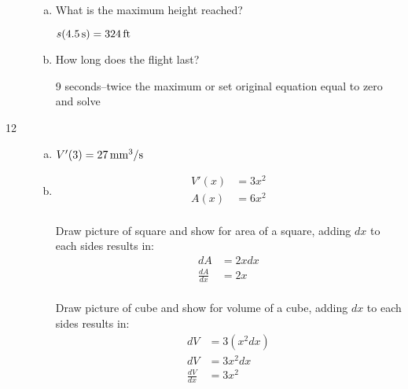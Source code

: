 \documentclass[letterpaper, landscape]{exam}
\begin{document}
\begin{description}
\begin{enumerate}[(a)]
        \item What is the maximum height reached?
          \begin{solution}
            $s(\unit[4.5]{s}) = \unit[324]{ft}$
          \end{solution}

        \item How long does the flight last?
          \begin{solution}
            9 seconds--twice the maximum or set original equation equal to zero and solve
          \end{solution}

      \end{enumerate}

    \item[12]
      \begin{enumerate}[(a)]
        \item 

          \begin{solution}
            $V'(3) = \unit[27]{mm^3/s}$
          \end{solution}

        \item
          \begin{solution}
            \begin{align*}
              V'(x) & = 3x^2 \\
              A(x)  & = 6x^2 \\
            \end{align*}

            Draw picture of square and show for area of a square, adding $dx$ to each sides 
            results in:
            \begin{align*}
              dA            & = 2x dx \\
              \frac{dA}{dx} & = 2x \\
            \end{align*}

            Draw picture of cube and show for volume of a cube, adding $dx$ to each sides 
            results in:
            \begin{align*}
              dV            & = 3 \left( x^2 dx \right) \\
              dV            & = 3 x^2 dx \\
              \frac{dV}{dx} & = 3x^2 \\
            \end{align*}


\end{solution}
\end{enumerate}
\end{description}
\end{document}
